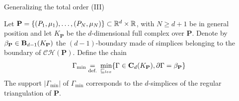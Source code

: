 \begin{frame}{Generalizing the total order (III)}
\scriptsize
\begin{theorem}
	Let $\mathbf{P} = \{(P_1, \mu_1) , \ldots, (P_N, \mu_N) \} \subset \mathbb{R}^d \times \mathbb{R}$, with $N \geq d+1$ be in general position and let $K_{\mathbf{P}}$ be the $d$-dimensional full complex  over $\mathbf{P}$. Denote by $\beta_{\mathbf{P}} \in \mathbf{B}_{d-1}(K_{\mathbf{P}})$ the $(d-1)$-boundary made of simplices belonging to the boundary of $\mathcal{CH}(\mathbf{P})$. Define the chain
	\begin{equation*}
		\Gamma_{\min} \underset{\text{def.}}{=} \:  \min_{\sqsubseteq_{lex}}  \{ \Gamma \in  \mathbf{C}_d(K_{\mathbf{P}}),  \partial \Gamma = \beta_{\mathbf{P}} \}
	\end{equation*}
	The support $|\Gamma_{\min}|$ of  $\Gamma_{\min}$ corresponds to the $d$-simplices of the regular triangulation of $\mathbf{P}$.
\end{theorem}

\end{frame}


